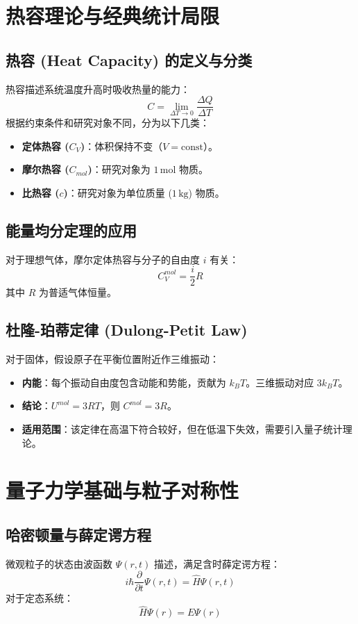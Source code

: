 \documentclass{article}
\begin{document}
\section{热容理论与经典统计局限}

\subsection{热容 (Heat Capacity) 的定义与分类}
热容描述系统温度升高时吸收热量的能力：
\[ C = \lim_{\Delta T \to 0} \frac{\Delta Q}{\Delta T} \]
根据约束条件和研究对象不同，分为以下几类：
\begin{itemize}
    \item \textbf{定体热容 ($C_V$)}：体积保持不变（$V = \text{const}$）。
    \item \textbf{摩尔热容 ($C_{mol}$)}：研究对象为 $1 \, \text{mol}$ 物质。
    \item \textbf{比热容 ($c$)}：研究对象为单位质量 ($1 \, \text{kg}$) 物质。
\end{itemize}

\subsection{能量均分定理的应用}
对于理想气体，摩尔定体热容与分子的自由度 $i$ 有关：
\[ C_V^{mol} = \frac{i}{2} R \]
其中 $R$ 为普适气体恒量。

\subsection{杜隆-珀蒂定律 (Dulong-Petit Law)}
对于固体，假设原子在平衡位置附近作三维振动：
\begin{itemize}
    \item \textbf{内能}：每个振动自由度包含动能和势能，贡献为 $k_B T$。三维振动对应 $3k_B T$。
    \item \textbf{结论}：$U^{mol} = 3RT$，则 $C^{mol} = 3R$。
    \item \textbf{适用范围}：该定律在高温下符合较好，但在低温下失效，需要引入量子统计理论。
\end{itemize}

\section{量子力学基础与粒子对称性}

\subsection{哈密顿量与薛定谔方程}
微观粒子的状态由波函数 $\Psi(r, t)$ 描述，满足含时薛定谔方程：
\[ i\hbar \frac{\partial}{\partial t} \Psi(r, t) = \hat{H} \Psi(r, t) \]
对于定态系统：
\[ \hat{H} \Psi(r) = E \Psi(r) \]
\end{document}

